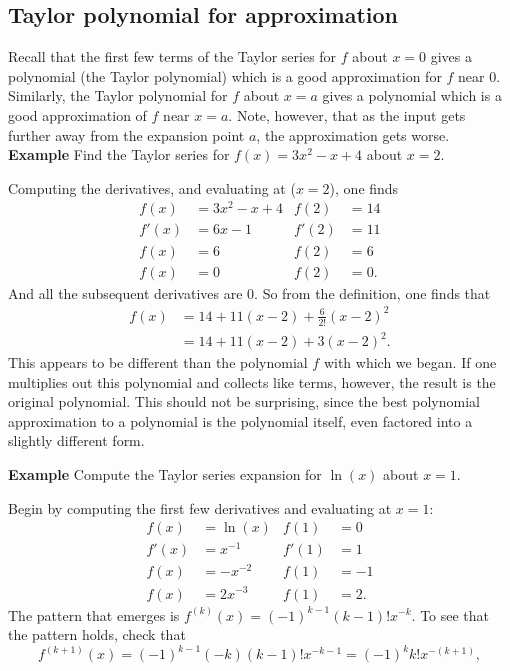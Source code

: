\documentclass[a4paper]{book}
\begin{document}
\begin{sloppypar}
\subsection{Taylor polynomial for approximation}
Recall that the first few terms of the Taylor series for $f$ about $x=0$ gives a polynomial (the Taylor polynomial) which is a good approximation for $f$ near 0. Similarly, the Taylor polynomial for $f$ about $x=a$ gives a polynomial which is a good approximation of $f$ near $x=a$. Note, however, that as the input gets further away from the expansion point $a$, the approximation gets worse.
\textbf{Example} Find the Taylor series for $f(x) = 3x^2-x+4$ about $x=2$.
\begin{examplebox}
Computing the derivatives, and evaluating at ($x=2$), one finds
\begin{align*}
f(x) &= 3x^2-x+4 & f(2) &= 14 \\
f'(x) &= 6x-1 & f'(2) &= 11 \\
f(x) &= 6 & f(2) &= 6 \\
f(x) &= 0 & f(2) &= 0. 
\end{align*}
And all the subsequent derivatives are 0. So from the definition, one finds that
\begin{align*}
f(x) &= 14 + 11(x-2) + \frac{6}{2!}(x-2)^2 \\
&= 14 + 11(x-2) + 3(x-2)^2.
\end{align*}
This appears to be different than the polynomial $f$ with which we began. If one multiplies out this polynomial and collects like terms, however, the result is the original polynomial. This should not be surprising, since the best polynomial approximation to a polynomial is the polynomial itself, even factored into a slightly different form.
\end{examplebox}
\textbf{Example} Compute the Taylor series expansion for $\ln(x)$ about $x=1$. 
\begin{examplebox}
Begin by computing the first few derivatives and evaluating at $x=1$:
\begin{align*}
f(x) &= \ln(x) & f(1) &= 0 \\
f'(x) &= x^{-1} & f'(1) &=1 \\
f(x) &= -x^{-2} & f(1) &= -1 \\
f(x) &= 2x^{-3} & f(1) &= 2.
\end{align*}
The pattern that emerges is $f^{\left(k\right)}(x) = (-1)^{k-1}(k-1)!x^{-k}$. To see that the pattern holds, check that
\begin{equation*}
f^{\left(k+1\right)}(x) = (-1)^{k-1} (-k)(k-1)!x^{-k-1} = (-1)^k k! x^{-(k+1)},

\end{equation*}
\end{examplebox}
\end{sloppypar}
\end{document}
